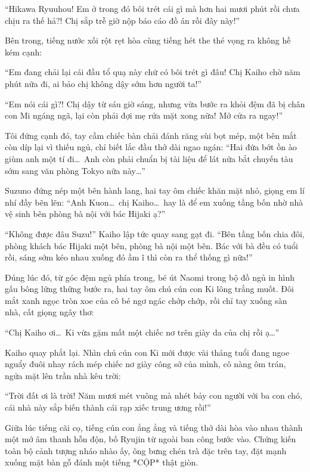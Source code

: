 \documentclass[../main.tex]{subfiles}
\begin{document}
``Hikawa Ryuuhou! Em ở trong đó bôi trét cái gì mà hơn hai mươi phút rồi chưa chịu ra thế hả?! Chị sắp trễ giờ nộp báo cáo đồ án rồi đây này!''

Bên trong, tiếng nước xối rột rẹt hòa cùng tiếng hét the thé vọng ra không hề kém cạnh:

``Em đang chải lại cái đầu tổ quạ này chứ có bôi trét gì đâu! Chị Kaiho chờ năm phút nữa đi, ai bảo chị không dậy sớm hơn người ta!''

``Em nói cái gì?! Chị dậy từ sáu giờ sáng, nhưng vừa bước ra khỏi đệm đã bị chân con Mi ngáng ngã, lại còn phải đợi mẹ rửa mặt xong nữa! Mở cửa ra ngay!''

Tôi đứng cạnh đó, tay cầm chiếc bàn chải đánh răng sùi bọt mép, một bên mắt còn díp lại vì thiếu ngủ, chỉ biết lắc đầu thở dài ngao ngán: ``Hai đứa bớt ồn ào giùm anh một tí đi\dots\ Anh còn phải chuẩn bị tài liệu để lát nữa bắt chuyến tàu sớm sang văn phòng Tokyo nữa này\dots''

Suzuno đứng nép một bên hành lang, hai tay ôm chiếc khăn mặt nhỏ, giọng em lí nhí đầy bẽn lẽn: ``Anh Kuon\dots\ chị Kaiho\dots\ hay là để em xuống tầng bốn nhờ nhà vệ sinh bên phòng bà nội với bác Hijaki ạ?''

``Không được đâu Suzu!'' Kaiho lập tức quay sang gạt đi. ``Bên tầng bốn chia đôi, phòng khách bác Hijaki một bên, phòng bà nội một bên. Bác với bà đều có tuổi rồi, sáng sớm kéo nhau xuống đó ầm ĩ thì còn ra thể thống gì nữa!''

Đúng lúc đó, từ góc đệm ngủ phía trong, bé út Naomi trong bộ đồ ngủ in hình gấu bông lững thững bước ra, hai tay ôm chú cún con Ki lông trắng muốt. Đôi mắt xanh ngọc tròn xoe của cô bé ngơ ngác chớp chớp, rồi chỉ tay xuống sàn nhà, cất giọng ngây thơ:

``Chị Kaiho ơi\dots\ Ki vừa gặm mất một chiếc nơ trên giày da của chị rồi ạ\dots''

Kaiho quay phắt lại. Nhìn chú cún con Ki mới được vài tháng tuổi đang ngoe nguẩy đuôi nhay rách mép chiếc nơ giày công sở của mình, cô nàng ôm trán, ngửa mặt lên trần nhà kêu trời:

``Trời đất ơi là trời! Năm mươi mét vuông mà nhét bảy con người với ba con chó, cái nhà này sắp biến thành cái rạp xiếc trung ương rồi!''

Giữa lúc tiếng cãi cọ, tiếng cún con ẳng ẳng và tiếng thở dài hòa vào nhau thành một mớ âm thanh hỗn độn, bố Ryujin từ ngoài ban công bước vào. Chứng kiến toàn bộ cảnh tượng nháo nhào ấy, ông bưng chén trà đặc trên tay, đặt mạnh xuống mặt bàn gỗ đánh một tiếng *CỘP* thật giòn.
\end{document}

